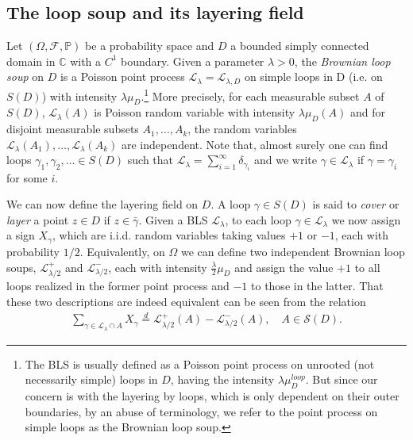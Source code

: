\documentclass[a4paper, 11pt, reqno]{amsart}
\theoremstyle{definition} \newtheorem{defn}{Definition}[section]
\theoremstyle{remark} \newtheorem{rem}[defn]{Remark}
\theoremstyle{remark} \newtheorem*{rem*}{Remark}
\theoremstyle{plain} \newtheorem{thm}[defn]{Theorem}
\theoremstyle{plain} \newtheorem{lem}[defn]{Lemma}
\theoremstyle{plain} \newtheorem{prop}[defn]{Proposition}
\theoremstyle{plain} \newtheorem{cor}[defn]{Corollary}
\theoremstyle{remark} \newtheorem{exm}[defn]{\textbf{Example}}
\theoremstyle{remark} \newtheorem{exms}[defn]{\textbf{Examples}}
\theoremstyle{remark} \newtheorem*{bl}{}
\numberwithin{equation}{section} %
\newcommand{\mc}{\mathcal}
\newcommand{\C}{\mathbb{C}}
\newcommand{\pr}{\mathbb{P}}
\begin{document}
   
	\subsection{The loop soup and its layering field}\label{sec:prelim_layering}

    Let $(\Omega, \mc{F}, \pr)$ be a probability space and $D$ a bounded simply connected domain in $\C$ with a $C^1$ boundary. Given a parameter $\lambda >0$, the \textit{Brownian loop soup} on $D$ is a Poisson point process $\mc{L}_{\lambda} =  \mc{L}_{\lambda, D}$ on simple loops in D (i.e. on $S(D)$) with intensity $\lambda \mu_D$.\footnote{The BLS is usually defined as a Poisson point process on  unrooted  (not necessarily simple) loops in $D$, having the intensity $\lambda\mu^{loop}_D$. But since our concern is with the layering by loops, which is only dependent on their outer boundaries, by an abuse of terminology, we refer to the point process on simple loops as the Brownian loop soup.  } More precisely, for each measurable subset $A$ of $S(D)$, $\mc{L}_{\lambda}(A)$ is Poisson random variable with intensity $\lambda \mu_D(A)$ and for disjoint measurable subsets $A_1, \ldots, A_k$, the random variables $\mc{L}_{\lambda}(A_1), \ldots, \mc{L}_{\lambda}(A_k)$ are independent. Note that, almost surely one can find loops $\gamma_1, \gamma_2, \ldots \in S(D)$ such that $\mc{L}_{\lambda} = \sum_{i =1}^{\infty} \delta_{\gamma_i}$ and we write $\gamma \in \mc{L}_{\lambda}$ if $\gamma = \gamma_i$ for some $i$. 
	
	We can now define the layering field on $D$. A loop $\gamma \in S(D)$ is said to \textit{cover} or \textit{layer} a point $z \in D$ if $z \in \bar{\gamma}$. Given a BLS $\mc{L}_{\lambda}$, to each loop $\gamma \in \mc{L}_{\lambda}$ we now assign a sign $X_{\gamma}$, which are i.i.d. random variables taking values $+ 1$ or $-1$, each with probability $1/2$. Equivalently, on $\Omega$ we can define two independent Brownian loop soups, $\mc{L}_{\lambda/2}^+$ and $\mc{L}_{\lambda/2}^-$, each with intensity $\frac{\lambda}{2} \mu_D$ and assign the value $+1$ to all loops realized in the former point process and $-1$ to those in the latter. That these two descriptions are indeed equivalent can be seen from the relation   
    \begin{align}
       \sum_{\gamma \in \mc{L}_{\lambda}\cap A} X_{\gamma} \stackrel{d}{=} \mc{L}_{\lambda/2}^+(A) - \mc{L}_{\lambda/2}^-(A), \quad A \in \mc{S}(D).
    \end{align} 
    
 
\end{document}
